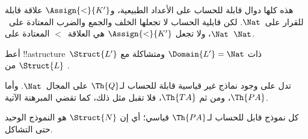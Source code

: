 \documentclass[../../../include/open-logic-section]{subfiles}
\begin{document}
\begin{ex}
هذه كلها دوال قابلة للحساب على الأعداد الطبيعية،
و$\Assign{<}{K'}$ علاقة قابلة للقرار على~$\Nat$.
لكن قابلية الحساب لا تجعلها الخلف والجمع والضرب
المعتادة على~$\Nat$، ولا تجعل $\Assign{<}{K'}$
هي العلاقة~$<$ المعتادة على~$\Nat$.
\end{ex}

\begin{prob}
أعط !!a{structure}~$\Struct{L'}$ ذات $\Domain{L'}=\Nat$ ومتشاكلة مع
$\Struct{L}$ من .
\end{prob}

\begin{explain}
تدل  على وجود نماذج غير قياسية
قابلة للحساب لـ$\Th{Q}$ على المجال~$\Nat$.
وأما $\Th{PA}$، ومن ثم $\Th{TA}$، فلا تقبل مثل ذلك،
كما تقضي المبرهنة الآتية.
\end{explain}

\begin{thm}
كل نموذج قابل للحساب لـ$\Th{PA}$ قياسي؛ أي إن $\Struct{N}$ هو النموذج
الوحيد حتى التشاكل.
\end{thm}
\end{document}
